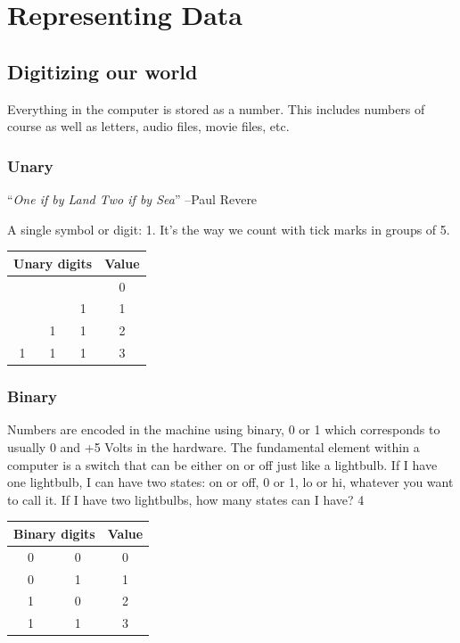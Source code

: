 \documentclass[titlepage]{tufte-book}
\newcounter{problem}
\begin{document}
\chapter{Representing Data}

\setcounter{problem}{1}

\section{Digitizing our world}

\begin{fullwidth}

Everything in the computer is stored as a number. This includes numbers of course as well as letters, audio files, movie files, etc.

\subsection{Unary}

``{\em One if by Land Two if by Sea}'' --Paul Revere

A single symbol or digit: 1.  It's the way we count with tick marks in groups of 5.

\begin{center}
\begin{tabular}{|ccc|c|}
\hline
\multicolumn{3}{|c|}{Unary digits} & Value\\
\hline
&       &    & 0\\
&       & 1 & 1\\
& 1    & 1 & 2\\
1 & 1 & 1 & 3\\
\hline
\end{tabular}
\end{center}

\subsection{Binary}

Numbers are encoded in the machine using binary, 0 or 1 which corresponds to usually 0 and +5 Volts in the hardware. The fundamental element within a computer is a switch that can be either on or off just like a lightbulb. If I have one lightbulb, I can have two states: on or off, 0 or 1, lo or hi, whatever you want to call it. If I have two lightbulbs, how many states can I have? 4

\begin{center}
\begin{tabular}{|cc|c|}
\hline
\multicolumn{2}{|c|}{Binary digits} & Value\\
\hline
0 & 0 & 0\\
0 & 1 & 1\\
1 & 0 & 2\\
1 & 1 & 3\\
\hline
\end{tabular}
\end{center}


\end{fullwidth}
\end{document}
